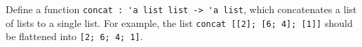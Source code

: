 Define a function \lstinline{concat : 'a list list -> 'a list}, which concatenates a list of lists to a single list.  For example, the list \lstinline{concat [[2]; [6; 4]; [1]]} should be flattened into \lstinline{[2; 6; 4; 1]}.
